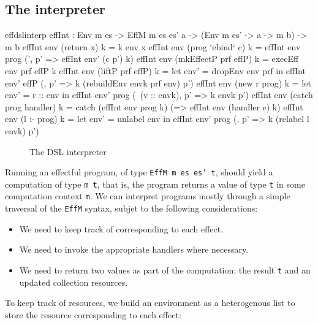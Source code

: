 \subsection{The \Eff{} interpreter}

\begin{SaveVerbatim}{effdslinterp}
effInt : Env m es -> EffM m es es' a -> (Env m es' -> a -> m b) -> m b
effInt env (return x) k = k env x
effInt env (prog `ebind` c) k = effInt env prog (\env', p' => effInt env' (c p') k)
effInt env (mkEffectP prf effP) k = execEff env prf effP k
effInt env (liftP prf effP) k = let env' = dropEnv env prf in 
                                    effInt env' effP (\envk, p' => k (rebuildEnv envk prf env) p')
effInt env (new r prog) k = let env' = r :: env in 
                                effInt env' prog (\ (v :: envk), p' => k envk p')
effInt env (catch prog handler) k = catch (effInt env prog k)
                                          (\e => effInt env (handler e) k)
effInt env (l :- prog) k = let env' = unlabel env in
                                      effInt env' prog (\envk, p' => k (relabel l envk) p')
\end{SaveVerbatim}

\begin{figure*}[t]
\begin{center}
\end{center}
\caption{The \Eff{} DSL interpreter}
\label{effdslimp}
\end{figure*}

Running an effectful program, of type \texttt{EffM m es es' t}, should yield
a computation of type \texttt{m t}, that is, the program returns a value of type
\texttt{t} in some computation context \texttt{m}. We can interpret programs
mostly through a simple traversal of the \texttt{EffM} syntax, subjet to the
following considerations:

\begin{itemize}
\item We need to keep track of  corresponding to each effect.
\item We need to invoke the appropriate handlers where necessary.
\item We need to return two values as part of the computation: the result
\texttt{t} and an updated collection resources.
\end{itemize}

\noindent
To keep track of resources, we build an environment as a heterogenous list to
store the resource corresponding to each effect:

